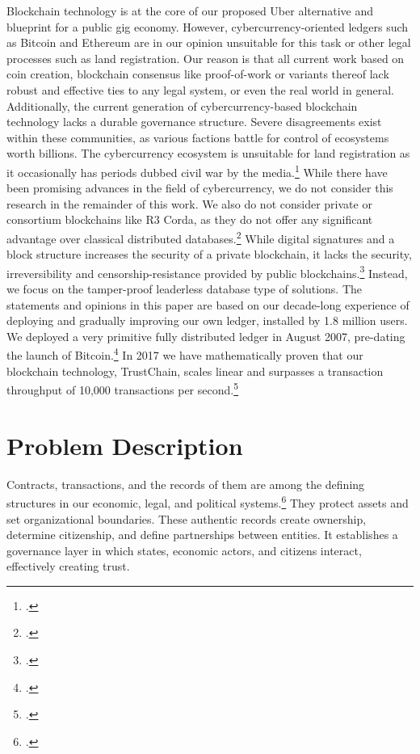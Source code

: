 \documentclass[USenglish]{article}
\begin{document}
Blockchain technology is at the core of our proposed Uber alternative and blueprint for a public gig economy.
However, cybercurrency-oriented ledgers such as Bitcoin and Ethereum are in our opinion unsuitable for this task or other legal processes such as land registration.
Our reason is that all current work based on coin creation, blockchain consensus like proof-of-work or variants thereof lack robust and effective ties to any legal system, or even the real world in general.
Additionally, the current generation of cybercurrency-based blockchain technology lacks a durable governance structure.
Severe disagreements exist within these communities, as various factions battle for control of ecosystems worth billions.
The cybercurrency ecosystem is unsuitable for land registration as it occasionally has periods dubbed civil war by the media.\footcite{bloombergbitcoinsplinter}
While there have been promising advances in the field of cybercurrency, we do not consider this research in the remainder of this work.
We also do not consider private or consortium blockchains like R3 Corda, as they do not offer any significant advantage over classical distributed databases.\footcite{r3corda}
While digital signatures and a block structure increases the security of a private blockchain, it lacks the security, irreversibility and censorship-resistance provided by public blockchains.\footcite{privateblockchainnarayanan}
Instead, we focus on the tamper-proof leaderless database type of solutions.
The statements and opinions in this paper are based on our decade-long experience of deploying and gradually improving our own ledger, installed by 1.8 million users.
We deployed a very primitive fully distributed ledger in August 2007, pre-dating the launch of Bitcoin.\footcite{bbcnewstribler}
In 2017 we have mathematically proven that our blockchain technology, TrustChain, scales linear and surpasses a transaction throughput of 10,000 transactions per second.\footcite{githubissueconsensus}

\section{Problem Description}

Contracts, transactions, and the records of them are among the defining structures in our economic, legal, and political systems.\footcite{harvardbusinessblockchain}
They protect assets and set organizational boundaries.
These authentic records create ownership, determine citizenship, and define partnerships between entities.
It establishes a governance layer in which states, economic actors, and citizens interact, effectively creating trust.
\end{document}
